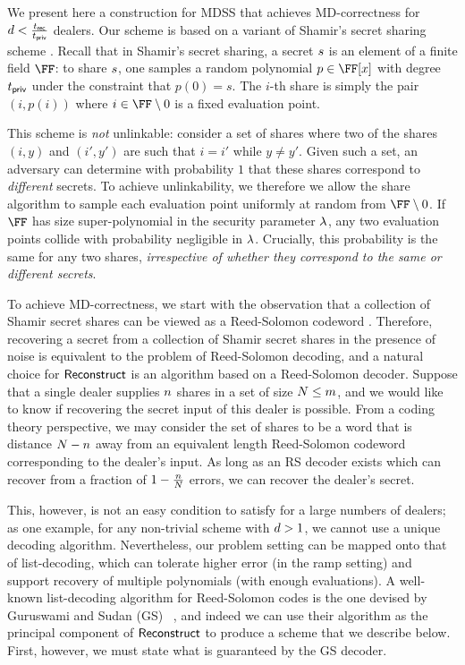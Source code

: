 We present here a construction for MDSS that achieves MD-correctness for $d < \frac{t_{\mathsf{rec}}}{t_{\mathsf{priv}}}$ dealers.
Our scheme is based on a variant of Shamir's secret sharing scheme \cite{Shamir79}.
Recall that in Shamir's secret sharing, a secret $s$ is an element of a finite field $\FF$: to share $s$, one samples a random polynomial $p \in \FF[x]$ with degree $t_{\mathsf{priv}}$ under the constraint that $p(0) = s$.
The $i$-th share is simply the pair $(i, p(i))$ where $i \in \FF \setminus 0$ is a fixed evaluation point.

This scheme is {\em not} unlinkable: consider a set of shares where two of the shares $(i,y)$ and $(i',y')$ are such that $i=i'$ while  $y\neq y'$.
Given such a set, an adversary can determine with probability $1$ that these shares correspond to {\em different} secrets.
To achieve unlinkability, we therefore we allow the share algorithm to sample each evaluation point uniformly at random from $\FF \setminus 0$.
If $\FF$ has size super-polynomial in the security parameter $\lambda$, any two evaluation points collide with probability negligible in $\lambda$.
Crucially, this probability is the same for any two shares, {\em irrespective of whether they correspond to the same or different secrets}.

To achieve MD-correctness, we start with the observation that a collection of Shamir secret shares can be viewed as a Reed-Solomon codeword \cite{localReeSol60, localMcEliece81}.
Therefore, recovering a secret from a collection of Shamir secret shares in the presence of noise is equivalent to the problem of Reed-Solomon decoding, and a natural choice for $\mathsf{Reconstruct}$ is an algorithm based on a Reed-Solomon decoder.
Suppose that a single dealer supplies $n$ shares in a set of size $N \leq m$, and we would like to know if recovering the secret input of this dealer is possible.
From a coding theory perspective, we may consider the set of shares to be a word that is distance $N-n$ away from an equivalent length Reed-Solomon codeword corresponding to the dealer's input.
As long as an RS decoder exists which can recover from a fraction of $1 - \frac{n}{N}$ errors, we can recover the dealer's secret.

This, however, is not an easy condition to satisfy for a large numbers of dealers; as one example, for any non-trivial scheme with $d > 1$, we cannot use a unique decoding algorithm.
Nevertheless, our problem setting can be mapped onto that of list-decoding, which can tolerate higher error (in the ramp setting) and support recovery of multiple polynomials (with enough evaluations).
A well-known list-decoding algorithm for Reed-Solomon codes is the one devised by Guruswami and Sudan (GS) ~\cite{FOCS:GurSud98}, and indeed we can use their algorithm as the principal component of $\mathsf{Reconstruct}$ to produce a scheme that we describe below.
First, however, we must state what is guaranteed by the GS decoder.

